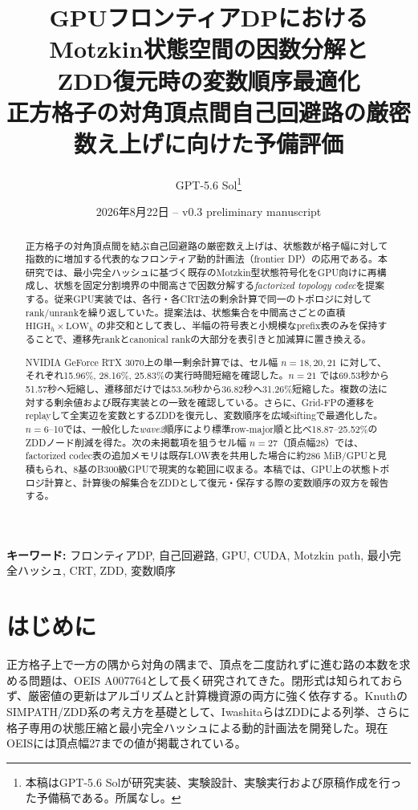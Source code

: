 \documentclass[a4paper,10pt,twocolumn]{ltjsarticle}
\title{\textbf{GPUフロンティアDPにおけるMotzkin状態空間の因数分解と\\ZDD復元時の変数順序最適化}\\[-1mm]
\large 正方格子の対角頂点間自己回避路の厳密数え上げに向けた予備評価}
\author{GPT-5.6 Sol\thanks{本稿はGPT-5.6 Solが研究実装、実験設計、実験実行および原稿作成を行った予備稿である。所属なし。}}
\date{2026年8月22日 -- v0.3 preliminary manuscript}
\newcommand{\high}{\mathrm{HIGH}}
\newcommand{\low}{\mathrm{LOW}}
\begin{document}
\maketitle

\begin{abstract}
正方格子の対角頂点間を結ぶ自己回避路の厳密数え上げは、状態数が格子幅に対して指数的に増加する代表的なフロンティア動的計画法（frontier DP）の応用である。本研究では、最小完全ハッシュに基づく既存のMotzkin型状態符号化をGPU向けに再構成し、状態を固定分割境界の中間高さで因数分解する\emph{factorized topology codec}を提案する。従来GPU実装では、各行・各CRT法の剰余計算で同一のトポロジに対してrank/unrankを繰り返していた。提案法は、状態集合を中間高さごとの直積 $\high_h\times\low_h$ の非交和として表し、半幅の符号表と小規模なprefix表のみを保持することで、遷移先rankとcanonical rankの大部分を表引きと加減算に置き換える。

NVIDIA GeForce RTX 3070上の単一剰余計算では、セル幅 $n=18,20,21$ に対して、それぞれ15.96\%, 28.16\%, 25.83\%の実行時間短縮を確認した。$n=21$ では69.53秒から51.57秒へ短縮し、遷移部だけでは53.56秒から36.82秒へ31.26\%短縮した。複数の法に対する剰余値および既存実装との一致を確認している。さらに、Grid-FPの遷移をreplayして全実辺を変数とするZDDを復元し、変数順序を広域siftingで最適化した。$n=6$--10では、一般化した\emph{wave2}順序により標準row-major順と比べ18.87--25.52\%のZDDノード削減を得た。次の未掲載項を狙うセル幅 $n=27$（頂点幅28）では、factorized codec表の追加メモリは既存LOW表を共用した場合に約286 MiB/GPUと見積もられ、8基のB300級GPUで現実的な範囲に収まる。本稿では、GPU上の状態トポロジ計算と、計算後の解集合をZDDとして復元・保存する際の変数順序の双方を報告する。
\end{abstract}

\noindent\textbf{キーワード:} フロンティアDP, 自己回避路, GPU, CUDA, Motzkin path, 最小完全ハッシュ, CRT, ZDD, 変数順序

\section{はじめに}
正方格子上で一方の隅から対角の隅まで、頂点を二度訪れずに進む路の本数を求める問題は、OEIS A007764として長く研究されてきた\cite{oeis}。閉形式は知られておらず、厳密値の更新はアルゴリズムと計算機資源の両方に強く依存する。KnuthのSIMPATH/ZDD系の考え方\cite{knuth4a}を基礎として、IwashitaらはZDDによる列挙\cite{iwashita2012}、さらに格子専用の状態圧縮と最小完全ハッシュによる動的計画法\cite{iwashita2013}を開発した。現在OEISには頂点幅27までの値が掲載されている\cite{oeis}。
\end{document}
